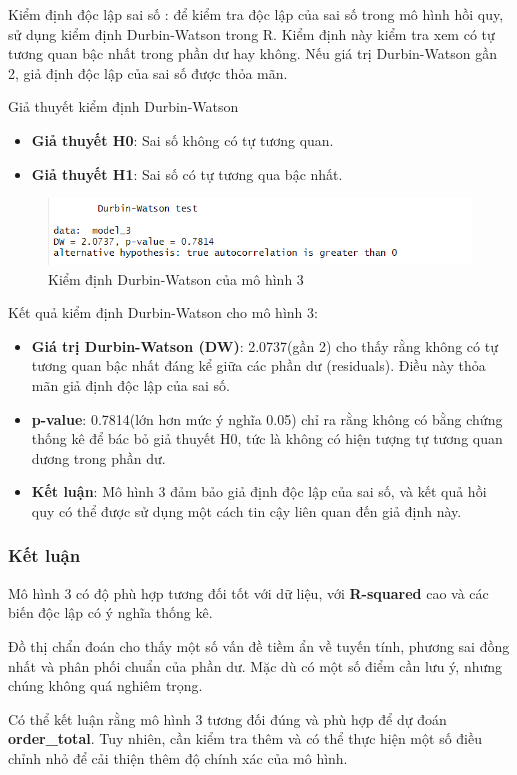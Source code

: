 Kiểm định độc lập sai số : để kiểm tra độc lập của sai số trong mô hình hồi quy, sử dụng kiểm định Durbin-Watson trong R. Kiểm định này kiểm tra xem có tự tương quan bậc nhất trong phần dư hay không. Nếu giá trị Durbin-Watson gần 2, giả định độc lập của sai số được thỏa mãn.

Giả thuyết kiểm định Durbin-Watson
\begin{itemize}
  \item\textbf{Giả thuyết H0}: Sai số không có tự tương quan.
  \item\textbf{Giả thuyết H1}: Sai số có tự tương qua bậc nhất.
\end{itemize}

\begin{figure}[H]
  \centering
  \includegraphics[width=0.5\linewidth]{graphics/5.5.8.png}
  \caption{Kiểm định Durbin-Watson của mô hình 3 }
\end{figure}

Kết quả kiểm định Durbin-Watson cho mô hình 3:
\begin{itemize}
  \item\textbf{Giá trị Durbin-Watson (DW)}: 2.0737(gần 2) cho thấy rằng không có tự tương quan bậc nhất đáng kể giữa các phần dư (residuals). Điều này thỏa mãn giả định độc lập của sai số.
  \item \textbf{p-value}: 0.7814(lớn hơn mức ý nghĩa 0.05) chỉ ra rằng không có bằng chứng thống kê để bác bỏ giả thuyết H0, tức là không có hiện tượng tự tương quan dương trong phần dư.
  \item\textbf{Kết luận}:  Mô hình 3 đảm bảo giả định độc lập của sai số, và kết quả hồi quy có thể được sử dụng một cách tin cậy liên quan đến giả định này.
\end{itemize}

\subsubsection{Kết luận}

Mô hình 3 có độ phù hợp tương đối tốt với dữ liệu, với \textbf{R-squared} cao và các biến độc lập có ý nghĩa thống kê.

Đồ thị chẩn đoán cho thấy một số vấn đề tiềm ẩn về tuyến tính, phương sai đồng nhất và phân phối chuẩn của phần dư. Mặc dù có một số điểm cần lưu ý, nhưng chúng không quá nghiêm trọng.

Có thể kết luận rằng mô hình 3 tương đối đúng và phù hợp để dự đoán \textbf{order\_total}. Tuy nhiên, cần kiểm tra thêm và có thể thực hiện một số điều chỉnh nhỏ để cải thiện thêm độ chính xác của mô hình.







